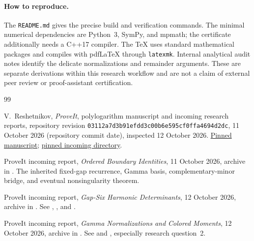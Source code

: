 \documentclass[11pt,a4paper]{article}
\numberwithin{equation}{section}
\theoremstyle{definition}
\theoremstyle{remark}
\begin{document}
\paragraph{How to reproduce.}
The \texttt{README.md} gives the precise build and verification
commands. The minimal numerical dependencies are Python~3,
SymPy, and mpmath; the certificate additionally needs a C++17
compiler. The TeX uses standard mathematical packages and compiles
with pdfLaTeX through \texttt{latexmk}. Internal analytical audit
notes identify the delicate normalizations and remainder arguments.
These are separate derivations within this research workflow and are
not a claim of external peer review or proof-assistant certification.


\begin{thebibliography}{99}

V.~Reshetnikov, \emph{ProveIt}, polylogarithm manuscript and incoming
research reports, repository revision
\texttt{03112a7d3b91efdd3c00b6e595cf0ffa4694d2dc},
11 October 2026 (repository commit date), inspected 12 October 2026.
\href{https://github.com/VladimirReshetnikov/ProveIt/tree/03112a7d3b91efdd3c00b6e595cf0ffa4694d2dc/Analysis/Polylogarithms/docs/manuscript}{Pinned manuscript};
\href{https://github.com/VladimirReshetnikov/ProveIt/tree/03112a7d3b91efdd3c00b6e595cf0ffa4694d2dc/docs/incoming}{pinned incoming directory}.

ProveIt incoming report, \emph{Ordered Boundary Identities},
11 October 2026, archive
in \cite{ProveIt}. The inherited fixed-gap recurrence, Gamma basis,
complementary-minor bridge, and eventual nonsingularity theorem.

ProveIt incoming report, \emph{Gap-Six Harmonic Determinants},
12 October 2026, archive
in \cite{ProveIt}. See ,
, and .

ProveIt incoming report, \emph{Gamma Normalizations and Colored Moments},
12 October 2026, archive
in \cite{ProveIt}. See  and
, especially research question~2.


\end{thebibliography}
\end{document}
